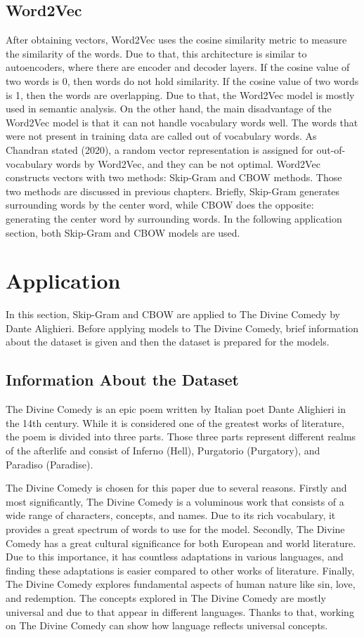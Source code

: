 \documentclass[man]{apa7}
\begin{document}
\subsection{Word2Vec}

After obtaining vectors, Word2Vec uses the cosine similarity metric to measure the similarity of the words. Due to that, this architecture is similar to autoencoders, where there are encoder and decoder layers. If the cosine value of two words is 0, then words do not hold similarity. If the cosine value of two words is 1, then the words are overlapping. Due to that, the Word2Vec model is mostly used in semantic analysis. On the other hand, the main disadvantage of the Word2Vec model is that it can not handle vocabulary words well. The words that were not present in training data are called out of vocabulary words.  As Chandran stated (2020), a random vector representation is assigned for out-of-vocabulary words by Word2Vec, and they can be not optimal. Word2Vec constructs vectors with two methods: Skip-Gram and CBOW methods. Those two methods are discussed in previous chapters. Briefly, Skip-Gram generates surrounding words by the center word, while CBOW does the opposite: generating the center word by surrounding words. In the following application section, both Skip-Gram and CBOW models are used.

\section{Application}
In this section, Skip-Gram and CBOW are applied to The Divine Comedy by Dante Alighieri. Before applying models to The Divine Comedy, brief information about the dataset is given and then the dataset is prepared for the models.

\subsection{Information About the Dataset}
The Divine Comedy is an epic poem written by Italian poet Dante Alighieri in the 14th century. While it is considered one of the greatest works of literature, the poem is divided into three parts. Those three parts represent different realms of the afterlife and consist of Inferno (Hell), Purgatorio (Purgatory), and Paradiso (Paradise).

The Divine Comedy is chosen for this paper due to several reasons. Firstly and most significantly, The Divine Comedy is a voluminous work that consists of a wide range of characters, concepts, and names. Due to its rich vocabulary, it provides a great spectrum of words to use for the model. Secondly, The Divine Comedy has a great cultural significance for both European and world literature. Due to this importance, it has countless adaptations in various languages, and finding these adaptations is easier compared to other works of literature. Finally, The Divine Comedy explores fundamental aspects of human nature like sin, love, and redemption. The concepts explored in The Divine Comedy are mostly universal and due to that appear in different languages. Thanks to that, working on The Divine Comedy can show how language reflects universal concepts.
\end{document}
